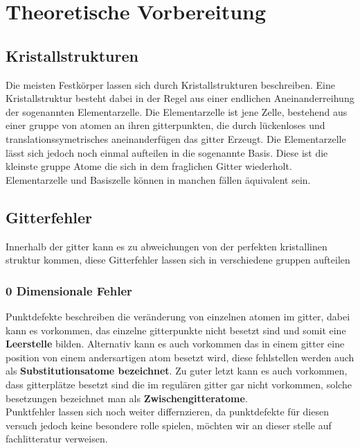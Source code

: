\section{Theoretische Vorbereitung}
    \subsection{Kristallstrukturen}
        Die meisten Festkörper lassen sich durch Kristallstrukturen beschreiben. Eine Kristallstruktur besteht
        dabei in der Regel aus einer endlichen Aneinanderreihung der sogenannten Elementarzelle. Die Elementarzelle ist
        jene Zelle, bestehend aus einer gruppe von atomen an ihren gitterpunkten, die durch lückenloses und translationssymetrisches aneinanderfügen das gitter Erzeugt. Die Elementarzelle
        lässt sich jedoch noch einmal aufteilen in die sogenannte Basis. Diese ist die kleinste gruppe Atome die
        sich in dem fraglichen Gitter wiederholt. Elementarzelle und Basiszelle können in manchen fällen äquivalent sein.
    \subsection{Gitterfehler}
        Innerhalb der gitter kann es zu abweichungen von der perfekten kristallinen struktur kommen, diese Gitterfehler lassen
        sich in verschiedene gruppen aufteilen
        \subsubsection*{0 Dimensionale Fehler}
            Punktdefekte beschreiben die veränderung von einzelnen atomen im gitter, dabei kann es vorkommen, das 
            einzelne gitterpunkte nicht besetzt sind und somit eine \textbf{Leerstelle} bilden.
            Alternativ kann es auch vorkommen das in einem gitter eine position von einem andersartigen atom besetzt wird,
            diese fehlstellen werden auch als \textbf{Substitutionsatome bezeichnet}.
            Zu guter letzt kann es auch vorkommen, dass gitterplätze besetzt sind die im regulären gitter gar nicht vorkommen,
            solche besetzungen bezeichnet man als \textbf{Zwischengitteratome}.\\
            Punktfehler lassen sich noch weiter differnzieren, da punktdefekte für diesen versuch jedoch keine besondere
            rolle spielen, möchten wir an dieser stelle auf fachlitteratur verweisen.
